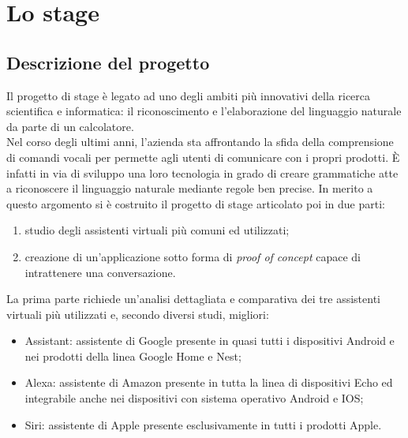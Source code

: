 
\chapter{Lo stage}
\label{cap:lo-stage}


\section{Descrizione del progetto}
Il progetto di stage è legato ad uno degli ambiti più innovativi della ricerca scientifica e informatica: il riconoscimento e l'elaborazione del linguaggio naturale da parte di un calcolatore. \\
Nel corso degli ultimi anni, l'azienda sta affrontando la sfida della comprensione di comandi vocali per permette agli utenti di comunicare con i propri prodotti. È infatti in via di sviluppo una loro tecnologia in grado di creare grammatiche atte a riconoscere il linguaggio naturale mediante regole ben precise. In merito a questo argomento si è costruito il progetto di stage articolato poi in due parti:
\begin{enumerate}
	\item studio degli assistenti virtuali più comuni ed utilizzati;
	\item creazione di un'applicazione sotto forma di \textit{proof of concept} capace di intrattenere una conversazione.
\end{enumerate}
La prima parte richiede un'analisi dettagliata e comparativa dei tre assistenti virtuali più utilizzati e, secondo diversi studi, migliori:
\begin{itemize}
	\item Assistant: assistente di Google presente in quasi tutti i dispositivi Android e nei prodotti della linea Google Home e Nest;
	\item Alexa: assistente di Amazon presente in tutta la linea di dispositivi Echo ed integrabile anche nei dispositivi con sistema operativo Android e IOS;
	\item Siri: assistente di Apple presente esclusivamente in tutti i prodotti Apple.
\end{itemize}
